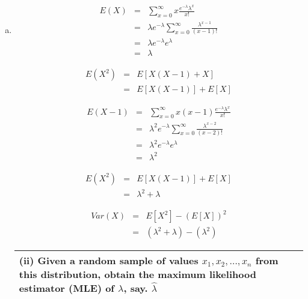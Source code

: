 \documentclass[a4paper,12pt]{article}
\begin{document}
\begin{enumerate}[(a)]
\item 

\begin{multicols}{2}
\begin{eqnarray*}
E(X) &=&  \sum^{\infty}_{x=0} x \frac{e^{-\lambda}\lambda^{x}}{x!}  \\
&=&  \lambda e^{-\lambda}\sum^{\infty}_{x=0} \frac{\lambda^{x-1}}{(x-1)!}  \\
&=& \lambda e^{-\lambda} e^{\lambda}\\
&=& \lambda
\end{eqnarray*}

\begin{eqnarray*} E(X^2) &=& E[X(X-1) + X] \\ &=& E[X(X-1)] + E[X] 
\end{eqnarray*}
\end{multicols}

\begin{multicols}{2}
\begin{eqnarray*}
E(X-1) &=&  \sum^{\infty}_{x=0} x(x-1)\frac{e^{-\lambda}\lambda^{x}}{x!}  \\
&=&  \lambda^2 e^{-\lambda}\sum^{\infty}_{x=0} \frac{\lambda^{x-2}}{(x-2)!}  \\
&=& \lambda^2 e^{-\lambda} e^{\lambda}\\
&=& \lambda^2
\end{eqnarray*}

\begin{eqnarray*} E(X^2) &=& E[X(X-1)] + E[X] \\ &=& \lambda^2 + \lambda \end{eqnarray*}

\begin{eqnarray*}Var(X) &=& E[X^2] - (E[X])^2 \\ &=& (\lambda^2 + \lambda)- (\lambda^2) \end{eqnarray*}
\end{multicols}

\newpage
\begin{table}[ht!]
\centering

\begin{tabular}{|p{15cm}|}
\hline        

\noindent

(ii) Given a random sample of values $x_1, x_2, \ldots, x_n$ from this distribution, obtain the maximum likelihood estimator (MLE) of $\lambda$, say. $\hat{\lambda}$
\\ \hline
      

\end{tabular}
\end{table}
\end{enumerate}
\end{document}
